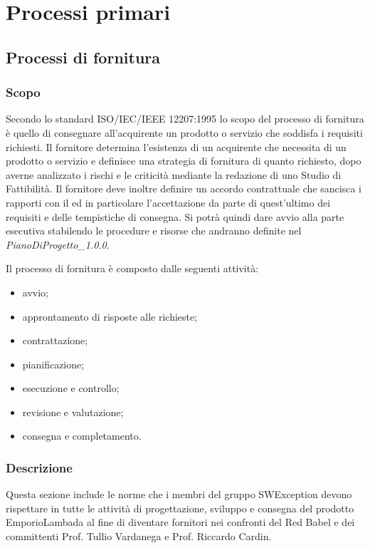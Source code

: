 \section{Processi primari}

\subsection{Processi di fornitura}
\label{_processiDiFornitura}
\subsubsection{Scopo}
Secondo lo standard ISO/IEC/IEEE 12207:1995 lo scopo del processo di fornitura è quello di consegnare all'acquirente un prodotto o servizio che soddisfa i requisiti richiesti.  Il fornitore determina l'esistenza di un acquirente che necessita di un prodotto o servizio e definisce una strategia di fornitura di quanto richiesto, dopo averne analizzato i rischi e le criticità mediante la redazione di uno Studio di Fattibilità.
Il fornitore deve inoltre definire un accordo contrattuale che sancisca i rapporti con il  ed in particolare l'accettazione da parte di quest'ultimo dei requisiti e delle tempistiche di consegna.  Si potrà quindi dare avvio alla parte esecutiva stabilendo le procedure e risorse che andranno definite nel \textit{PianoDiProgetto\_1.0.0}.

Il processo di fornitura è composto dalle seguenti attività:
\begin{itemize}
  \item avvio;
  \item approntamento di risposte alle richieste;
  \item contrattazione;
  \item pianificazione;
  \item esecuzione e controllo;
  \item revisione e valutazione;
  \item consegna e completamento.
\end{itemize}

\subsubsection{Descrizione}
Questa sezione include le norme che i membri del gruppo SWException devono rispettare in tutte le attività di progettazione, sviluppo e consegna del prodotto EmporioLambada al fine di diventare fornitori nei confronti del  Red Babel e dei committenti Prof. Tullio Vardanega e Prof. Riccardo Cardin.
